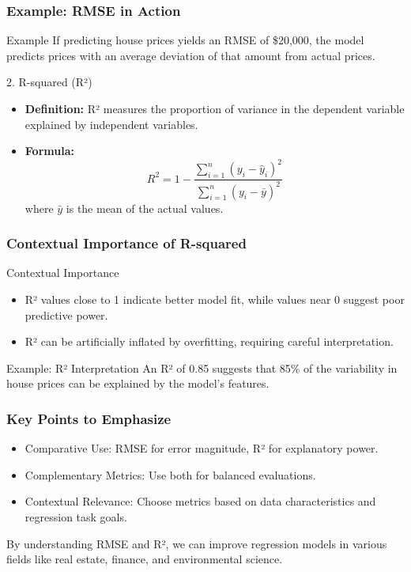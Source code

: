 \documentclass[aspectratio=169]{beamer}
\begin{document}
\begin{frame}[fragile]
    \frametitle{Example: RMSE in Action}
    \begin{block}{Example}
        If predicting house prices yields an RMSE of \$20,000, the model predicts prices with an average deviation of that amount from actual prices.
    \end{block}
    
    \begin{block}{2. R-squared (R²)}
        \begin{itemize}
            \item \textbf{Definition:} R² measures the proportion of variance in the dependent variable explained by independent variables.
            \item \textbf{Formula:}
            \begin{equation}
                R^2 = 1 - \frac{\sum_{i=1}^{n} (y_i - \hat{y}_i)^2}{\sum_{i=1}^{n} (y_i - \bar{y})^2}
            \end{equation}
            where \(\bar{y}\) is the mean of the actual values.
        \end{itemize}
    \end{block}
\end{frame}

\begin{frame}[fragile]
    \frametitle{Contextual Importance of R-squared}
    \begin{block}{Contextual Importance}
        \begin{itemize}
            \item R² values close to 1 indicate better model fit, while values near 0 suggest poor predictive power.
            \item R² can be artificially inflated by overfitting, requiring careful interpretation.
        \end{itemize}
    \end{block}

    \begin{block}{Example: R² Interpretation}
        An R² of 0.85 suggests that 85\% of the variability in house prices can be explained by the model's features.
    \end{block}
\end{frame}

\begin{frame}[fragile]
    \frametitle{Key Points to Emphasize}
    \begin{itemize}
        \item Comparative Use: RMSE for error magnitude, R² for explanatory power.
        \item Complementary Metrics: Use both for balanced evaluations.
        \item Contextual Relevance: Choose metrics based on data characteristics and regression task goals.
    \end{itemize}
    By understanding RMSE and R², we can improve regression models in various fields like real estate, finance, and environmental science.
\end{frame}
\end{document}

